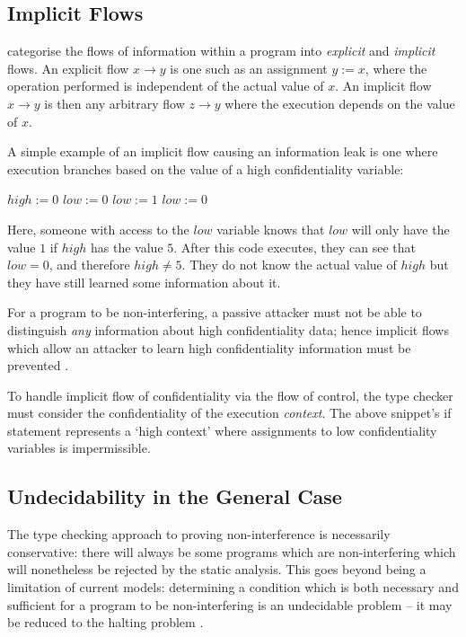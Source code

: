 \subsection{Implicit Flows}

\citeauthor{denning1977certification} \cite{denning1977certification} categorise the flows of information within a program into \textit{explicit} and \textit{implicit} flows. An explicit flow $ x \rightarrow y $ is one such as an assignment $ y := x $, where the operation performed is independent of the actual value of $ x $. An implicit flow $ x \rightarrow y $ is then any arbitrary flow $ z \rightarrow y $ where the execution depends on the value of $ x $. 

A simple example of an implicit flow causing an information leak is one where execution branches based on the value of a high confidentiality variable:

\begin{algorithmic}
	\State $ high := 0 $
	\State $ low := 0 $
		\State $ low := 1 $
	\Else
		\State $ low := 0 $
	\EndIf
\end{algorithmic}

Here, someone with access to the $ low $ variable knows that $ low $ will only have the value $ 1 $ if $ high $ has the value $ 5 $. After this code executes, they can see that $ low = 0 $, and therefore $ high \ne 5 $. They do not know the actual value of $ high $ but they have still learned some information about it.

For a program to be non-interfering, a passive attacker must not be able to distinguish \textit{any} information about high confidentiality data; hence implicit flows which allow an attacker to learn high confidentiality information must be prevented \cite{sabelfeld2003if}.


To handle implicit flow of confidentiality via the flow of control, the type checker must consider the confidentiality of the execution \textit{context}. The above snippet's if statement represents a `high context' where assignments to low confidentiality variables is impermissible.

\subsection{Undecidability in the General Case}

The type checking approach to proving non-interference is necessarily conservative: there will always be some programs which are non-interfering which will nonetheless be rejected by the static analysis. This goes beyond being a limitation of current models: determining a condition which is both necessary and sufficient for a program to be non-interfering is an undecidable problem \cite{denning1977certification} \cite{landi1992undecidability} -- it may be reduced to the halting problem \cite{sabelfeld2003if}.

